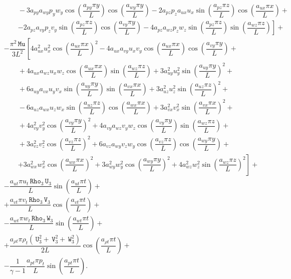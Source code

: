 \documentclass[10pt]{article}
\newcommand{\Rho}{\,\mathtt{Rho}}
\newcommand{\U}{\,\mathtt{U}}
\newcommand{\V}{\,\mathtt{V}}
\newcommand{\W}{\,\mathtt{W}}
\newcommand{\MU}{\,\mathtt{Mu}}
\begin{document}
\begin{equation}
\begin{split}
    &\qquad-3 a_{py} a_{wy} p_y w_y \cos\left(\dfrac{a_{py} \pi y}{L}\right) \cos\left(\dfrac{a_{wy} \pi y}{L}\right)-2 a_{pz} p_z a_{ux} u_x \sin\left(\dfrac{a_{pz} \pi z}{L}\right) \cos\left(\dfrac{a_{ux} \pi x}{L}\right)+\\
    &\qquad\left. -2 a_{pz} a_{vy} p_z v_y \sin\left(\dfrac{a_{pz} \pi z}{L}\right) \cos\left(\dfrac{a_{vy} \pi y}{L}\right)-4 a_{pz} a_{wz} p_z w_z \sin\left(\dfrac{a_{pz} \pi z}{L}\right) \sin\left(\dfrac{a_{wz} \pi z}{L}\right)\right]+\\
%
&- \dfrac{ \pi^2 \MU }{3L^2}\left[4 a_{ux}^2 u_x^2 \cos\left(\dfrac{a_{ux} \pi x}{L}\right)^2-4 a_{ux} a_{vy} u_x v_y \cos\left(\dfrac{a_{ux} \pi x}{L}\right) \cos\left(\dfrac{a_{vy} \pi y}{L}\right)+\right.\\
    &\qquad+4 a_{ux} a_{wz} u_x w_z \cos\left(\dfrac{a_{ux} \pi x}{L}\right) \sin\left(\dfrac{a_{wz} \pi z}{L}\right)+3 a_{uy}^2 u_y^2 \sin\left(\dfrac{a_{uy} \pi y}{L}\right)^2+\\
    &\qquad+6 a_{uy} a_{vx} u_y v_x \sin\left(\dfrac{a_{uy} \pi y}{L}\right) \sin\left(\dfrac{a_{vx} \pi x}{L}\right)+3 a_{uz}^2 u_z^2 \sin\left(\dfrac{a_{uz} \pi z}{L}\right)^2+\\
    &\qquad-6 a_{uz} a_{wx} u_z w_x \sin\left(\dfrac{a_{uz} \pi z}{L}\right) \cos\left(\dfrac{a_{wx} \pi x}{L}\right)+3 a_{vx}^2 v_x^2 \sin\left(\dfrac{a_{vx} \pi x}{L}\right)^2+\\
    &\qquad+4 a_{vy}^2 v_y^2 \cos\left(\dfrac{a_{vy} \pi y}{L}\right)^2+4 a_{vy} a_{wz} v_y w_z \cos\left(\dfrac{a_{vy} \pi y}{L}\right) \sin\left(\dfrac{a_{wz} \pi z}{L}\right)+\\
    &\qquad+3 a_{vz}^2 v_z^2 \cos\left(\dfrac{a_{vz} \pi z}{L}\right)^2+6 a_{vz} a_{wy} v_z w_y \cos\left(\dfrac{a_{vz} \pi z}{L}\right) \cos\left(\dfrac{a_{wy} \pi y}{L}\right)+\\
    &\qquad\left.+3 a_{wx}^2 w_x^2 \cos\left(\dfrac{a_{wx} \pi x}{L}\right)^2+3 a_{wy}^2 w_y^2 \cos\left(\dfrac{a_{wy} \pi y}{L}\right)^2+4 a_{wz}^2 w_z^2 \sin\left(\dfrac{a_{wz} \pi z}{L}\right)^2\right]+\\
& -\dfrac{a_{ut} \pi u_t  \Rho_3 \U_3 }{L}\sin\left(\dfrac{a_{ut} \pi t}{L}\right)+\\
&+\dfrac{a_{vt} \pi v_t  \Rho_3 \V_3 }{L}\cos\left(\dfrac{a_{vt} \pi t}{L}\right)+\\
&- \dfrac{a_{wt} \pi w_t  \Rho_3 \W_3}{L}\sin\left(\dfrac{a_{wt} \pi t}{L}\right)+\\
&+\dfrac{a_{\rho t} \pi \rho_t (\U_3^2+\V_3^2+\W_3^2)  }{2L}\cos\left(\dfrac{a_{\rho t} \pi t}{L}\right)+\\
&-\dfrac{1}{\gamma-1}\dfrac{a_{pt} \pi p_t }{L}\sin\left(\dfrac{a_{pt} \pi t}{L}\right).
\end{split}
\end{equation}
\end{document}
